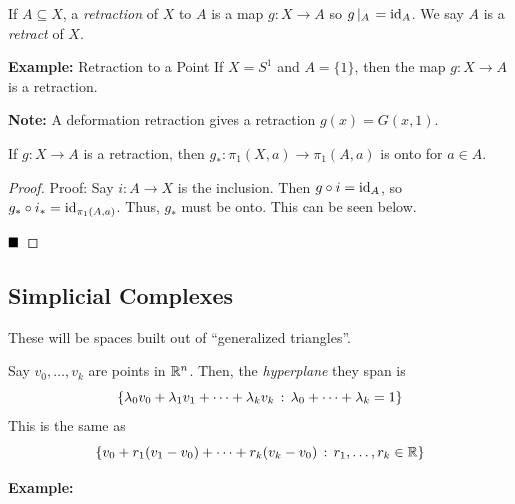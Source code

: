 \begin{definition}
    If $A \subseteq X$, a \emph{retraction} of $X$ to $A$ is a map $g : X \to A$ so $g\left|_{A}\right. = \text{id}_A$. We say $A$ is a \emph{retract} of $X$.
\end{definition}

\begin{example}{\textbf{Example:} Retraction to a Point}
    If $X = S^1$ and $A = \{1\}$, then the map $g : X \to A$ is a retraction.
\end{example}

\textbf{Note:} A deformation retraction gives a retraction $g(x) = G(x, 1)$.

\begin{lemma}
    If $g : X \to A$ is a retraction, then $g_{*} : \pi_1(X, a) \to \pi_1(A, a)$ is onto for $a \in A$. 
\end{lemma}
\begin{proof}{Proof:}
    Say $i : A \to X$ is the inclusion. Then $g \circ i = \text{id}_A$, so $g_* \circ i_* = \text{id}_{\pi_1(A, a)}$. Thus, $g_*$ must be onto. This can be seen below. 
    \begin{center}
    \end{center}

    $\qed$
\end{proof}

\subsection*{Simplicial Complexes}
\sectionspace

These will be spaces built out of ``generalized triangles''.

\begin{definition}
    Say $v_0, \ldots, v_k$ are points in $\mathbb{R}^n$. Then, the \emph{hyperplane} they span is
    \[ \{\lambda_0 v_0 + \lambda_1 v_1 + \cdots + \lambda_k v_k \, :\, \lambda_0 + \cdots + \lambda_k = 1\} \]
    This is the same as
    \[ \{v_0 + r_1(v_1 - v_0) + \cdots + r_k(v_k - v_0) \, :\, r_1, \ldots, r_k \in \mathbb{R}\} \]
\end{definition}

\textbf{Example:}


